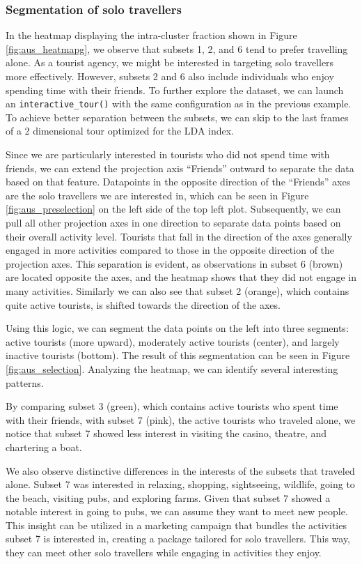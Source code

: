 \documentclass[article]{ajs}
\begin{document}
\subsubsection{Segmentation of solo travellers}

In the heatmap displaying the intra-cluster fraction shown in Figure \ref{fig:aus_heatmapg}, we observe that subsets 1, 2, and 6 tend to prefer travelling alone. As a tourist agency, we might be interested in targeting solo travellers more effectively. However, subsets 2 and 6 also include individuals who enjoy spending time with their friends. To further explore the dataset, we can launch an \texttt{interactive\_tour()} with the same configuration as in the previous example. To achieve better separation between the subsets, we can skip to the last frames of a 2 dimensional tour optimized for the LDA index. 

Since we are particularly interested in tourists who did not spend time with friends, we can extend the projection axis ``Friends'' outward to separate the data based on that feature. Datapoints in the opposite direction of the ``Friends'' axes are the solo travellers we are interested in, which can be seen in Figure \ref{fig:aus_preselection} on the left side of the top left plot. Subsequently, we can pull all other projection axes in one direction to separate data points based on their overall activity level. Tourists that fall in the direction of the axes generally engaged in more activities compared to those in the opposite direction of the projection axes. This separation is evident, as observations in subset 6 (brown) are located opposite the axes, and the heatmap shows that they did not engage in many activities. Similarly we can also see that subset 2 (orange), which contains quite active tourists, is shifted towards the direction of the axes.

Using this logic, we can segment the data points on the left into three segments: active tourists (more upward), moderately active tourists (center), and largely inactive tourists (bottom). The result of this segmentation can be seen in Figure \ref{fig:aus_selection}. Analyzing the heatmap, we can identify several interesting patterns.

By comparing subset 3 (green), which contains active tourists who spent time with their friends, with subset 7 (pink), the active tourists who traveled alone, we notice that subset 7 showed less interest in visiting the casino, theatre, and chartering a boat.

We also observe distinctive differences in the interests of the subsets that traveled alone. Subset 7 was interested in relaxing, shopping, sightseeing, wildlife, going to the beach, visiting pubs, and exploring farms. Given that subset 7 showed a notable interest in going to pubs, we can assume they want to meet new people. This insight can be utilized in a marketing campaign that bundles the activities subset 7 is interested in, creating a package tailored for solo travellers. This way, they can meet other solo travellers while engaging in activities they enjoy.
\end{document}
